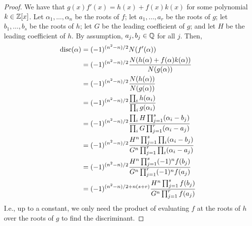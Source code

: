 \begin{proof}
    We have that $g(x)f'(x) = h(x)+f(x)k(x)$ for some polynomial $k \in \mathbb{Z}[x]$. Let $\alpha_1,\ldots,\alpha_n$ be the roots of $f$; let $a_1,\ldots,a_r$ be the roots of $g$; let $b_1,\ldots,b_s$ be the roots of $h$; let $G$ be the leading coefficient of $g$; and let $H$ be the leading coefficient of $h$. By assumption, $a_j,b_j \in \mathbb{Q}$ for all $j$. Then,
    \begin{align*}
    \operatorname{disc}(\alpha)
        &= (-1)^{(n^2-n)/2}N(f'(\alpha)) \\
        &= (-1)^{(n^2-n)/2}\frac{N(h(\alpha)+f(\alpha)k(\alpha))}{N(g(\alpha))} \\
        &= (-1)^{(n^2-n)/2}\frac{N(h(\alpha))}{N(g(\alpha))} \\
        &= (-1)^{(n^2-n)/2}\frac{\prod_i h(\alpha_i)}{\prod_i g(\alpha_i)} \\
        &= (-1)^{(n^2-n)/2}\frac{\prod_i H\prod_{j=1}^s (\alpha_i-b_j)}{\prod_i G\prod_{j=1}^r (\alpha_i-a_j)} \\
        &= (-1)^{(n^2-n)/2}\frac{H^n\prod_{j=1}^s \prod_i (\alpha_i-b_j)}{G^n\prod_{j=1}^r \prod_i (\alpha_i-a_j)} \\
        &= (-1)^{(n^2-n)/2}\frac{H^n\prod_{j=1}^s (-1)^nf(b_j)}{G^n\prod_{j=1}^r (-1)^nf(a_j)} \\
        &= (-1)^{(n^2-n)/2 + n(s+r)}\frac{H^n\prod_{j=1}^s f(b_j)}{G^n\prod_{j=1}^r f(a_j)}
    \end{align*}
    I.e., up to a constant, we only need the product of evaluating $f$ at the roots of $h$ over the roots of $g$ to find the discriminant.
\end{proof}
